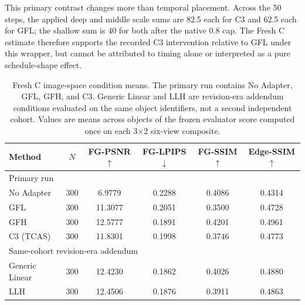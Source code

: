 \documentclass[times,twocolumn,final]{elsarticle}
\begin{document}
This primary contrast changes more than temporal placement. Across the 50 steps, the applied deep and middle scale sums are 82.5 each for C3 and 62.5 each for GFL; the shallow sum is 40 for both after the native 0.8 cap. The Fresh C estimate therefore supports the recorded C3 intervention relative to GFL under this wrapper, but cannot be attributed to timing alone or interpreted as a pure schedule-shape effect.

\begin{table}[t]
\centering
\caption{Fresh C image-space condition means. The primary run contains No Adapter, GFL, GFH, and C3. Generic Linear and LLH are revision-era addendum conditions evaluated on the same object identifiers, not a second independent cohort. Values are means across objects of the frozen evaluator score computed once on each 3$\times$2 six-view composite.}
\label{tab:freshc-absolute}
\scriptsize\setlength{\tabcolsep}{4pt}
\begin{tabular}{lccccc}
\toprule
Method & $N$ & FG-PSNR$\uparrow$ & FG-LPIPS$\downarrow$ & FG-SSIM$\uparrow$ & Edge-SSIM$\uparrow$ \\
\midrule
\multicolumn{6}{l}{Primary run} \\
No Adapter & 300 & 6.9779 & 0.2288 & 0.4086 & 0.4314 \\
GFL & 300 & 11.3077 & 0.2051 & 0.3500 & 0.4728 \\
GFH & 300 & 12.5777 & 0.1891 & 0.4201 & 0.4961 \\
C3 (TCAS) & 300 & 11.8301 & 0.1998 & 0.3746 & 0.4773 \\
\midrule
\multicolumn{6}{l}{Same-cohort revision-era addendum} \\
Generic Linear & 300 & 12.4230 & 0.1862 & 0.4026 & 0.4880 \\
LLH & 300 & 12.4506 & 0.1876 & 0.3911 & 0.4863 \\
\bottomrule
\end{tabular}
\end{table}
\end{document}
